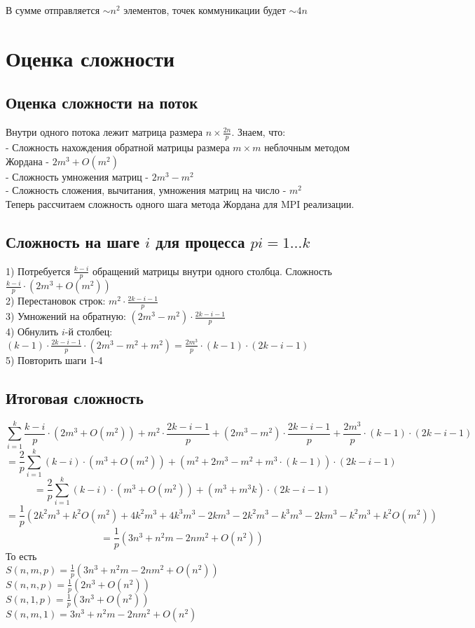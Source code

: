 \documentclass[a4paper,12pt]{article}
\begin{document}
В сумме отправляется $\sim n^2$ элементов, точек коммуникации будет $\sim 4n$ \\


\section{Оценка сложности}
\subsection{Оценка сложности на поток}
Внутри одного потока лежит матрица размера $n \times \frac{2n}{p}$.
Знаем, что: \\
- Сложность нахождения обратной матрицы размера $m \times m$ неблочным методом Жордана - $2m^3 + O(m^2)$ \\
- Сложность умножения матриц - $2m^3 - m^2$ \\
- Сложность сложения, вычитания, умножения матриц на число - $m^2$ \\
Теперь рассчитаем сложность одного шага метода Жордана для MPI реализации.

\subsection{Сложность на шаге $i$ для процесса $pi=1\dots k$}
1) Потребуется $\frac{k-i}{p}$ обращений матрицы внутри одного столбца. Сложность $\frac{k-i}{p} \cdot (2m^3 + O(m^2))$ \\
2) Перестановок строк: $m^2 \cdot \frac{2k - i - 1}{p}$ \\
3) Умножений на обратную: $(2m^3 - m^2) \cdot \frac{2k - i - 1}{p}$ \\
4) Обнулить $i$-й столбец: $(k-1) \cdot \frac{2k - i - 1}{p} \cdot (2m^3 - m^2 + m^2) = \frac{2m^3}{p} \cdot (k-1)\cdot(2k-i-1)$ \\
5) Повторить шаги 1-4 \\
\newpage
\subsection{Итоговая сложность}
$$
\sum_{i=1}^{k} \frac{k-i}{p} \cdot (2m^3 + O(m^2)) + m^2 \cdot \frac{2k - i - 1}{p} + (2m^3 - m^2) \cdot \frac{2k - i - 1}{p} + \frac{2m^3}{p} \cdot (k-1)\cdot(2k-i-1)
$$
$$
= \frac{2}{p} \sum_{i=1}^{k} (k-i) \cdot (m^3 + O(m^2)) + (m^2 + 2m^3 - m^2  + m^3 \cdot (k-1))\cdot(2k-i-1)
$$
$$
= \frac{2}{p} \sum_{i=1}^{k} (k-i) \cdot (m^3 + O(m^2)) + (m^3 + m^3k) \cdot(2k-i-1)
$$
$$
= \frac{1}{p}(2k^2m^3 + k^2O(m^2) + 4k^2m^3 + 4k^3m^3 - 2km^3 - 2k^2m^3 - k^3m^3 - 2km^3 - k^2m^3 + k^2O(m^2))
$$
$$
= \frac{1}{p}(3n^3 + n^2m - 2nm^2 + O(n^2))
$$
То есть  \\
$S(n, m, p) = \frac{1}{p}(3n^3 + n^2m - 2nm^2 + O(n^2))$\\
$S(n, n, p) = \frac{1}{p}(2n^3 + O(n^2))$\\
$S(n, 1, p) = \frac{1}{p}(3n^3 + O(n^2))$ \\
$S(n, m, 1) = 3n^3 + n^2m - 2nm^2 + O(n^2)$ \\
\end{document}
